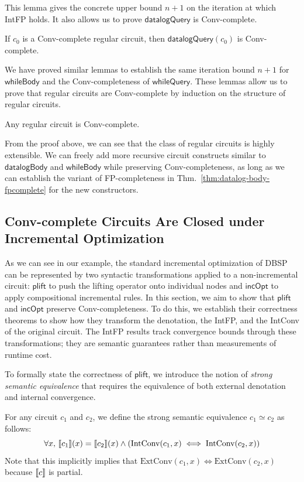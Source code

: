 This lemma gives the concrete upper bound $n+1$ on the iteration at which IntFP holds.
It also allows us to prove $\mathsf{datalogQuery}$ is Conv-complete.
\begin{lemma}\label{thm:datalog-query-convcomplete}
    If $c_0$ is a Conv-complete regular circuit, then $\mathsf{datalogQuery}(c_0)$ is Conv-complete.
\end{lemma}

We have proved similar lemmas to establish the same iteration bound $n+1$ for $\mathsf{whileBody}$ and the Conv-completeness of $\mathsf{whileQuery}$.
These lemmas allow us to prove that regular circuits are Conv-complete by induction on the structure of regular circuits.
\begin{theorem}\label{thm:regular-convcomplete}
    Any regular circuit is Conv-complete.
\end{theorem}

From the proof above, we can see that the class of regular circuits is highly extensible. We can freely add more recursive circuit constructs similar to $\mathsf{datalogBody}$ and $\mathsf{whileBody}$ while preserving Conv-completeness, as long as we can establish the variant of FP-completeness in Thm.~\ref{thm:datalog-body-fpcomplete} for the new constructors.  

\subsection{Conv-complete Circuits Are Closed under Incremental Optimization}\label{sec:inc-opt}

As we can see in our example, the standard incremental optimization of DBSP can be represented by two syntactic transformations applied to a non-incremental circuit: $\mathsf{plift}$ to push the lifting operator onto individual nodes and $\mathsf{incOpt}$ to apply compositional incremental rules. In this section, we aim to show that $\mathsf{plift}$ and $\mathsf{incOpt}$ preserve Conv-completeness. To do this, we establish their correctness theorems to show how they transform the denotation, the IntFP, and the IntConv of the original circuit. The IntFP results track convergence bounds through these transformations; they are semantic guarantees rather than measurements of runtime cost.

To formally state the correctness of $\mathsf{plift}$, we introduce the notion of \emph{strong semantic equivalence} that requires the equivalence of both external denotation and internal convergence.
\begin{definition}
    For any circuit $c_1$ and $c_2$, we define the strong semantic equivalence $c_1 \simeq c_2$ as follows:
    \[\forall x,\, \llbracket c_1 \rrbracket(x) = \llbracket c_2 \rrbracket(x) \land (\text{IntConv}(c_1, x) \iff \text{IntConv}(c_2, x)) \]
    Note that this implicitly implies that $\text{ExtConv}(c_1, x) \iff \text{ExtConv}(c_2, x)$ because $\llbracket c \rrbracket$ is partial.
\end{definition}


